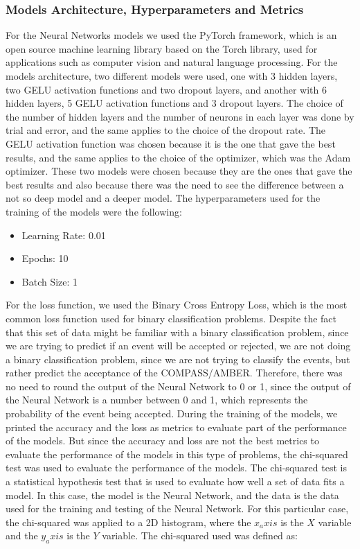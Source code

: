 \documentclass{article}
\begin{document}
\subsubsection*{Models Architecture, Hyperparameters and Metrics}
For the Neural Networks models we used the PyTorch framework, which is an open source machine learning library based on the Torch library, used for applications such as computer vision and natural language processing.
For the models architecture, two different models were used, one with 3 hidden layers, two GELU activation functions and two dropout layers, and another with 6 hidden layers, 5 GELU activation functions and 3 dropout layers.
The choice of the number of hidden layers and the number of neurons in each layer was done by trial and error, and the same applies to the choice of the dropout rate. 
The GELU activation function was chosen because it is the one that gave the best results, and the same applies to the choice of the optimizer, which was the Adam optimizer.
These two models were chosen because they are the ones that gave the best results and also because there was the need to see the difference between a not so deep model and a deeper model.
The hyperparameters used for the training of the models were the following:
\begin{itemize}
    \item Learning Rate: 0.01
    \item Epochs: 10
    \item Batch Size: 1
\end{itemize}

For the loss function, we used the Binary Cross Entropy Loss, which is the most common loss function used for binary classification problems.
Despite the fact that this set of data might be familiar with a binary classification problem, since we are trying to predict if an event will be accepted or rejected,
we are not doing a binary classification problem, since we are not trying to classify the events, but rather predict the acceptance of the COMPASS/AMBER.
Therefore, there was no need to round the output of the Neural Network to 0 or 1, since the output of the Neural Network is a number between 0 and 1, which represents the probability of the event being accepted.
During the training of the models, we printed the accuracy and the loss as metrics to evaluate part of the performance of the models.
But since the accuracy and loss are not the best metrics to evaluate the performance of the models in this type of problems, the chi-squared test was used to evaluate the performance of the models.
The chi-squared test is a statistical hypothesis test that is used to evaluate how well a set of data fits a model. In this case, the model is the Neural Network, and the data is the data used for the training and testing of the Neural Network.
For this particular case, the chi-squared was applied to a 2D histogram, where the $x_axis$ is the $X$ variable and the $y_axis$ is the $Y$ variable.
The chi-squared used was defined as:
\end{document}
